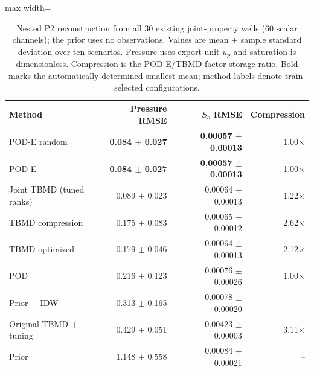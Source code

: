 \begin{table}[htbp]\centering\small
\caption{Nested P2 reconstruction from all 30 existing joint-property wells (60 scalar channels); the prior uses no observations. Values are mean $\pm$ sample standard deviation over ten scenarios. Pressure uses export unit $u_p$ and saturation is dimensionless. Compression is the POD-E/TBMD factor-storage ratio. Bold marks the automatically determined smallest mean; method labels denote train-selected configurations.}
\label{tab:optimization_main}
\setlength{\tabcolsep}{3pt}
\begin{adjustbox}{max width=\textwidth}
\begin{tabular}{lrrr}\toprule
Method & Pressure RMSE & $S_o$ RMSE & Compression \\ \midrule
POD-E random & \textbf{0.084 $\pm$ 0.027} & \textbf{0.00057 $\pm$ 0.00013} & 1.00$\times$ \\
POD-E & \textbf{0.084 $\pm$ 0.027} & \textbf{0.00057 $\pm$ 0.00013} & 1.00$\times$ \\
Joint TBMD (tuned ranks) & 0.089 $\pm$ 0.023 & 0.00064 $\pm$ 0.00013 & 1.22$\times$ \\
TBMD compression & 0.175 $\pm$ 0.083 & 0.00065 $\pm$ 0.00012 & 2.62$\times$ \\
TBMD optimized & 0.179 $\pm$ 0.046 & 0.00064 $\pm$ 0.00013 & 2.12$\times$ \\
POD & 0.216 $\pm$ 0.123 & 0.00076 $\pm$ 0.00026 & 1.00$\times$ \\
Prior + IDW & 0.313 $\pm$ 0.165 & 0.00078 $\pm$ 0.00020 & -- \\
Original TBMD + tuning & 0.429 $\pm$ 0.051 & 0.00423 $\pm$ 0.00003 & 3.11$\times$ \\
Prior & 1.148 $\pm$ 0.558 & 0.00084 $\pm$ 0.00021 & -- \\
\bottomrule\end{tabular}\end{adjustbox}\end{table}
